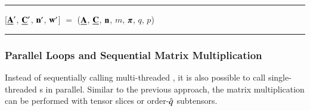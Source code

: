 \begin{algorithm}[t]
\footnotesize
\DontPrintSemicolon
\SetAlgoVlined
{}
%
%
%
\hrule
\BlankLine
{
	[$\mubA'$, $\mubC'$, $\mbn'$, $\mathbf{w}'$] $=$ \flatten($\mubA$, $\mubC$, $\mbn$, $m$, $\mbpi$, $q$, $p$)\;
	{
		{
			\;
		}
	}
}
\BlankLine
\hrule
\caption{%
\footnotesize
Function  is an optimized version of Algorithm \ref{alg:ttm.sequential.coalesced}.
The  function transforms the order-$p$ tensors $\mubA$ and $\mubC$ with layout tuple $\mbpi$ and their respective dimension tuples $\mbn$ and $\mbm$ into order-$4$ tensors $\mubA'$ and $\mubC'$ with layout tuple $\mbpi'$ and their respective dimension tuples $\mbn'$ and $\mbm'$ where $\mbn' = (n_{\pi_1},\mhn_{\pi_2},n_q,\mhn_{\pi_4})$ and $m_3' = m$ and $n_k' = m_k'$ for $k \neq 3$.
Each thread calls multiple single-threaded  functions each of which executes a slice-matrix multiplication with the order-$2$ tensor slices $\mubA_{ij}'$ and $\mubC_{ij}'$.
Matrix $\mbB$ has the row-major storage format.
\label{alg:ttm.slice.fused.parallel}
}
\end{algorithm}


\subsubsection{Parallel Loops and Sequential Matrix Multiplication}
Instead of sequentially calling multi-threaded , it is also possible to call single-threaded s in parallel.
Similar to the previous approach, the matrix multiplication can be performed with tensor slices or order-$\hat{q}$ subtensors.

